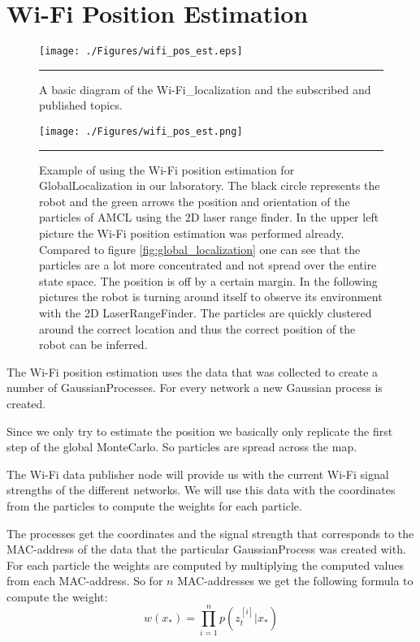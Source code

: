 \section{Wi-Fi Position Estimation}\label{sec:wifiposest}
\begin{figure}[htbp]
	\centering
		\texttt{[image: ./Figures/wifi\_pos\_est.eps]}
		\rule{35em}{0.5pt}
	\caption[Diagram of the Wi-Fi\_localization]{A basic diagram of the Wi-Fi\_localization and the subscribed and published topics.}
	\label{fig:ros_localization}
\end{figure}
\begin{figure}[htbp]
	\centering
		\texttt{[image: ./Figures/wifi\_pos\_est.png]}
		\rule{35em}{0.5pt}
	\caption[Wi-Fi position estimation example]{Example of using the Wi-Fi position estimation for \gls{GlobalLocalization} in our laboratory. The black circle represents the robot and the green arrows the position and orientation of the particles of AMCL using the 2D laser range finder. In the upper left picture the Wi-Fi position estimation was performed already. Compared to figure \ref{fig:global_localization} one can see that the particles are a lot more concentrated and not spread over the entire state space. The position is off by a certain margin. In the following pictures the robot is turning around itself to observe its environment with the 2D \gls{LaserRangeFinder}. The particles are quickly clustered around the correct location and thus the correct position of the robot can be inferred.}
	\label{fig:wifi_pos_est_example}
\end{figure}
The Wi-Fi position estimation uses the data that was collected to create a number of \Gls{GaussianProcess}es. For every network a new Gaussian process is created.

Since we only try to estimate the position we basically only replicate the first step of the global \Gls{MonteCarlo}. So particles are spread across the map. 

The Wi-Fi data publisher node will provide us with the current Wi-Fi signal strengths of the different networks. We will use this data with the coordinates from the particles to compute the weights for each particle. 

The processes get the coordinates and the signal strength that corresponds to the \Gls{MAC-address} of the data that the particular \Gls{GaussianProcess} was created with. For each particle the weights are computed by multiplying the computed values from each \Gls{MAC-address}. So for $n$ \Gls{MAC-address}es we get the following formula to compute the weight:
\begin{equation}
w(x_*) = \prod_{i=1}^np(z_{t}^{[i]}|x_*)
\end{equation} 

